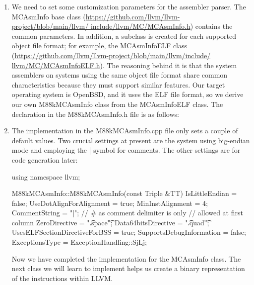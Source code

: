 \begin{enumerate}
\item
We need to set some customization parameters for the assembler parser. The MCAsmInfo base class (\url{https://github.com/llvm/llvm-project/blob/main/llvm/ include/llvm/MC/MCAsmInfo.h}) contains the common parameters. In addition, a subclass is created for each supported object file format; for example, the MCAsmInfoELF class (\url{https://github.com/llvm/llvm-project/blob/main/llvm/include/ llvm/MC/MCAsmInfoELF.h}). The reasoning behind it is that the system assemblers on systems using the same object file format share common characteristics because they must support similar features. Our target operating system is OpenBSD, and it uses the ELF file format, so we derive our own M88kMCAsmInfo class from the MCAsmInfoELF class. The declaration in the M88kMCAsmInfo.h file is as follows:

\begin{cpp}
namespace llvm {
class Triple;

class M88kMCAsmInfo : public MCAsmInfoELF {
public:
    explicit M88kMCAsmInfo(const Triple &TT);
};
\end{cpp}

\item
The implementation in the M88kMCAsmInfo.cpp file only sets a couple of default values. Two crucial settings at present are the system using big-endian mode and employing the | symbol for comments. The other settings are for code generation later:

\begin{cpp}
using namespace llvm;

M88kMCAsmInfo::M88kMCAsmInfo(const Triple &TT) {
    IsLittleEndian = false;
    UseDotAlignForAlignment = true;
    MinInstAlignment = 4;
    CommentString = "|"; // # as comment delimiter is only
                         // allowed at first column
    ZeroDirective = "\t.space\t";
    Data64bitsDirective = "\t.quad\t";
    UsesELFSectionDirectiveForBSS = true;
    SupportsDebugInformation = false;
    ExceptionsType = ExceptionHandling::SjLj;
}
\end{cpp}

Now we have completed the implementation for the MCAsmInfo class. The next class we will learn to implement helps us create a binary representation of the instructions within LLVM.
\end{enumerate}


